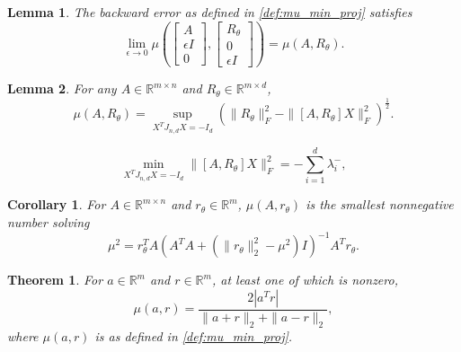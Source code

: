 \documentclass[10pt,a4paper]{amsart}
\newtheorem{lemma}{Lemma}
\newtheorem{corollary}{Corollary}
\newtheorem{theorem}{Theorem}
\newcommand{\ts}{^T}
\begin{document}
\begin{lemma}\label{lemma:continuity_argument}
    The backward error as defined in \cref{def:mu_min_proj} satisfies
    \[
    \lim_{\epsilon \rightarrow 0}\mu\left(\begin{bmatrix}
        A \\ \epsilon I \\ 0
    \end{bmatrix}, \begin{bmatrix}
        R_\theta \\ 0 \\ \epsilon I
    \end{bmatrix}\right) = \mu(A, R_\theta). 
    \]
\end{lemma}

\begin{lemma}\label{lemma:variational_first}
For any $A\in \mathbb{R}^{m\times n}$ and $R_\theta\in \mathbb{R}^{m\times d}$,
\begin{equation}\label{eqn:variational_first}
    \mu(A, R_\theta) = \sup_{X\ts J_{n,d}X = -I_d} \left(\|R_\theta\|_F^2 - \|[A, R_\theta]X\|_F^2\right)^{\frac{1}{2}}.
\end{equation}
\end{lemma}

    \begin{equation}\label{eqn:negative_genl_eigvals}
        \min_{X\ts J_{n,d}X = -I_d} \|[A,R_\theta]X\|_F^2 = -\sum_{i=1}^d\lambda_i^{-},
    \end{equation}

\begin{corollary}\label{cor:backward_error_fixed_point}
    For $A\in \mathbb{R}^{m\times n}$ and $r_\theta\in \mathbb{R}^m$, $\mu(A,r_\theta)$ is the smallest nonnegative number solving
    \begin{equation*}
        \mu^2 = r_\theta\ts A(A\ts A + (\|r_\theta\|_2^2 - \mu^2)I)^{-1}A\ts r_\theta.
    \end{equation*}
\end{corollary}

\begin{theorem}\label{thm:rank_two_eigenvalue_problem}
    For $a\in \mathbb{R}^m$ and $r \in \mathbb{R}^m$, at least one of which is nonzero, 
    \begin{equation*}
        \mu(a,r) = \frac{2 |a\ts r|}{\|a+r\|_2 + \|a-r\|_2},
    \end{equation*}
    where $\mu(a,r)$ is as defined in \cref{def:mu_min_proj}.
\end{theorem}
\end{document}
